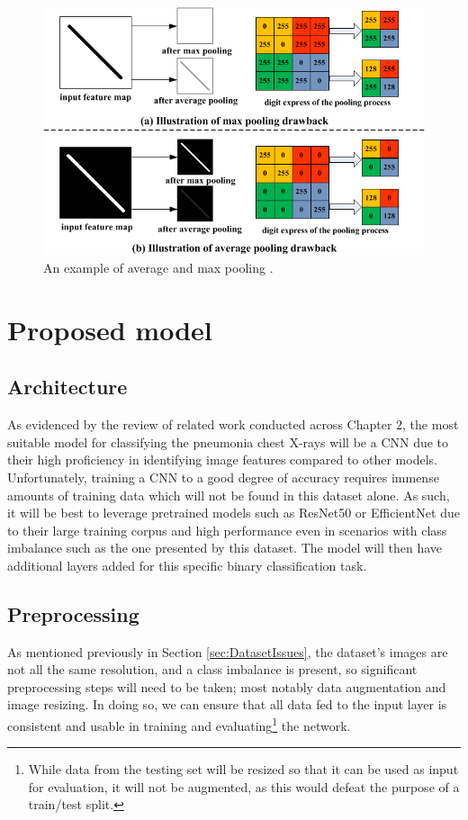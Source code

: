 \documentclass[12pt]{report}
\newcommand{\para}{\vspace{7pt}\noindent}
\begin{document}
\begin{figure}[H]
    \centering
    \includegraphics[width=\textwidth]{Proposal/PoolingLayers.png}
    \caption{An example of average and max pooling \autocite{yuMixedPoolingConvolutional2014}.\label{fig:Pooling}}
\end{figure}


\chapter{Proposed model}
\section{Architecture}\label{sec:ModelArchitecture}
As evidenced by the review of related work conducted across Chapter 2, the most suitable model for
classifying the pneumonia chest X-rays will be a CNN due to their high proficiency in identifying image 
features compared to other models. Unfortunately, training a CNN to a good degree of accuracy requires 
immense amounts of training data which will not be found in this dataset alone. As such, it will be 
best to leverage pretrained models such as ResNet50 or EfficientNet due to their large training 
corpus and high performance even in scenarios with class imbalance such as the one presented by this 
dataset. The model will then have additional layers added for this specific binary classification task.

\section{Preprocessing}
\para As mentioned previously in Section \ref{sec:DatasetIssues}, the dataset's images are not
all the same resolution, and a class imbalance is present, so significant preprocessing steps will need 
to be taken; most notably data augmentation and image resizing. In doing so, we can ensure that all 
data fed to the input layer is consistent and usable in training and evaluating\footnote{While data from the testing set will be resized so that it can be used as input for evaluation, it will not be augmented, as this would defeat the purpose of a train/test split.} 
the network.
\end{document}
